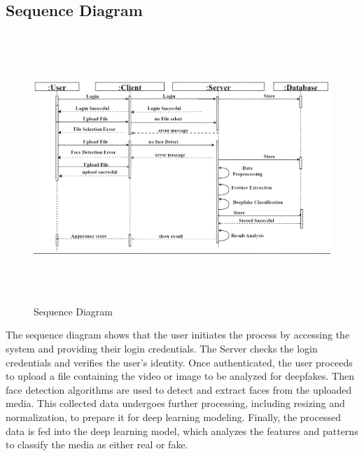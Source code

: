 \subsection{Sequence Diagram}

\begin{figure}[h]
    \centering
    \includegraphics[width=\textwidth, height=4in]{img/sequence_diagram (1).png}
    \caption{Sequence Diagram}
\end{figure}

\justify
The sequence diagram shows that the user initiates the process by accessing the system and providing their login credentials. The Server checks the login credentials and verifies the user's identity. Once authenticated, the user proceeds to upload a file containing the video or image to be analyzed for deepfakes. Then face detection algorithms are used to detect and extract faces from the uploaded media. This collected data undergoes further processing, including resizing and normalization, to prepare it for deep learning modeling. Finally, the processed data is fed into the deep learning model, which analyzes the features and patterns to classify the media as either real or fake.
